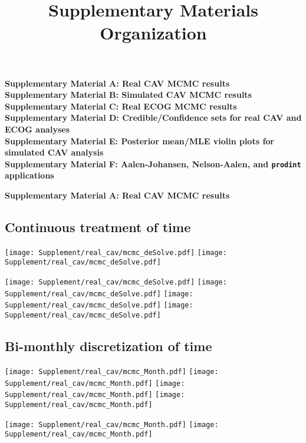 \documentclass{article}
\title{Supplementary Materials Organization}
\date{\vspace{-5ex}}
\begin{document}
\maketitle
\vspace{-0.2in}
\noindent \textbf{\large Supplementary Material A: Real CAV MCMC results}\\

\noindent \textbf{\large Supplementary Material B: Simulated CAV MCMC results}\\

\noindent \textbf{\large Supplementary Material C: Real ECOG MCMC results}\\

\noindent \textbf{\large Supplementary Material D: Credible/Confidence sets for real CAV and ECOG analyses}\\

\noindent \textbf{\large Supplementary Material E: Posterior mean/MLE violin plots for simulated CAV analysis}\\

\noindent \textbf{\large Supplementary Material F: Aalen-Johansen, Nelson-Aalen, and \texttt{prodint} applications}
\vspace{0.5in}


\noindent \textbf{\LARGE Supplementary Material A: Real CAV MCMC results}\\
\subsection*{Continuous treatment of time}
\begin{center}
    \texttt{[image: Supplement/real\_cav/mcmc\_deSolve.pdf]}
    \texttt{[image: Supplement/real\_cav/mcmc\_deSolve.pdf]}
\end{center}
\begin{center}
    \texttt{[image: Supplement/real\_cav/mcmc\_deSolve.pdf]}
    \texttt{[image: Supplement/real\_cav/mcmc\_deSolve.pdf]}
    \texttt{[image: Supplement/real\_cav/mcmc\_deSolve.pdf]}
    \texttt{[image: Supplement/real\_cav/mcmc\_deSolve.pdf]}
\end{center}

\subsection*{Bi-monthly discretization of time}
\begin{center}
    \texttt{[image: Supplement/real\_cav/mcmc\_Month.pdf]}
    \texttt{[image: Supplement/real\_cav/mcmc\_Month.pdf]}
    \texttt{[image: Supplement/real\_cav/mcmc\_Month.pdf]}
    \texttt{[image: Supplement/real\_cav/mcmc\_Month.pdf]}
\end{center}
\begin{center}
    \texttt{[image: Supplement/real\_cav/mcmc\_Month.pdf]}
    \texttt{[image: Supplement/real\_cav/mcmc\_Month.pdf]}
\end{center}
\end{document}
